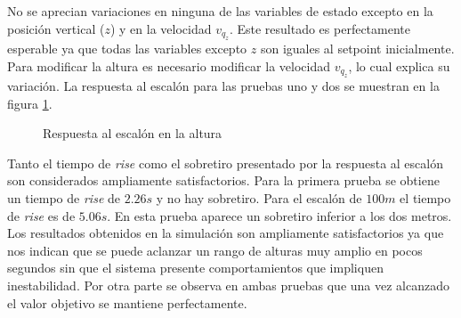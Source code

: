 \documentclass[main]{subfiles}
\begin{document}
No se aprecian variaciones en ninguna de las variables de estado excepto en la posici\'on vertical ($z$) y en la velocidad $v_{q_z}$. Este resultado es perfectamente esperable ya que todas las variables excepto $z$ son iguales al setpoint inicialmente. Para modificar la altura es necesario modificar la velocidad $v_{q_z}$, lo cual explica su variaci\'on. La respuesta al escal\'on para las pruebas uno y dos se muestran en la figura \ref{fig:hov_esc_z}. 
\begin{figure}
  \centering
  \caption{Respuesta al escal\'on en la altura}
  \label{fig:hov_esc_z}
\end{figure}

Tanto el tiempo de \emph{rise} como el sobretiro presentado por la respuesta al escal\'on son considerados ampliamente satisfactorios. Para la primera prueba se obtiene un tiempo de \emph{rise} de $2.26 s$ y no hay sobretiro. Para el escal\'on de $100m $ el tiempo de \emph{rise} es de $5.06 s$. En esta prueba aparece un sobretiro inferior a los dos metros. \\

Los resultados obtenidos en la simulaci\'on son ampliamente satisfactorios ya que nos indican que se puede aclanzar un rango de alturas muy amplio en pocos segundos sin que el sistema presente comportamientos que impliquen inestabilidad. Por otra parte se observa en ambas pruebas que una vez alcanzado el valor objetivo se mantiene perfectamente.\\
\end{document}
